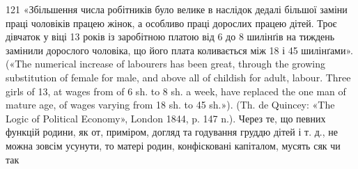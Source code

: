 121 «Збільшення числа робітників було велике в наслідок дедалі
більшої заміни праці чоловіків працею жінок, а особливо праці дорослих
працею дітей. Троє дівчаток у віці 13 років із заробітною платою від 6
до 8 шилінґів на тиждень замінили дорослого чоловіка, що його плата
коливається між 18 і 45 шилінґами». («The numerical increase of labourers
has been great, through the growing substitution of female for male, and
above all of childish for adult, labour. Three girls of 13, at wages from of
6 sh. to 8 sh. a week, have replaced the one man of mature age, of wages
varying from 18 sh. to 45 sh.»). (Th. de Quincey: «The Logic of Political
Economy», London 1844, p. 147 n.). Через те, що певних функцій родини,
як от, приміром, догляд та годування груддю дітей і т. д., не можна зовсім
усунути, то матері родин, конфісковані капіталом, мусять сяк чи так

